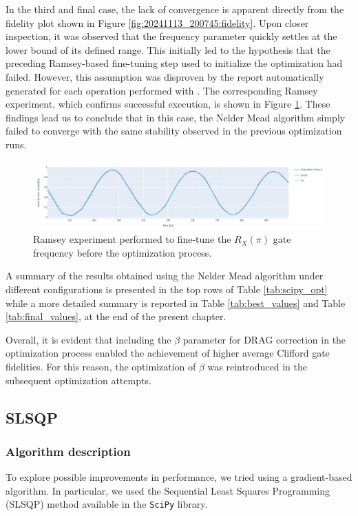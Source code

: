In the third and final case, the lack of convergence is apparent directly from the fidelity plot shown in Figure \ref{fig:20241113_200745:fidelity}.
Upon closer inspection, it was observed that the frequency parameter quickly settles at the lower bound of its defined range. 
This initially led to the hypothesis that the preceding Ramsey-based fine-tuning step used to initialize the optimization had failed.
However, this assumption was disproven by the report automatically generated for each operation performed with \Qibocal.
The corresponding Ramsey experiment, which confirms successful execution, is shown in Figure \ref{fig:Ramsey_NM}.
These findings lead us to conclude that in this case, the Nelder Mead algorithm simply failed to converge with the same stability observed in the previous optimization runs.

\begin{figure}[h!]
    \centering
    \includegraphics[width=\textwidth]{figures/png/RB_optimization/NM/InitialSymplex/20241113_200745/Ramsey.png}
    \caption{Ramsey experiment performed to fine-tune the $R_X(\pi)$ gate frequency before the optimization process.}
    \label{fig:Ramsey_NM}
\end{figure}

A summary of the results obtained using the Nelder Mead algorithm under different configurations is presented in the top rows of Table \ref{tab:scipy_opt} while a more detailed summary is reported in Table \ref{tab:best_values} and Table \ref{tab:final_values}, at the end of the present chapter.

Overall, it is evident that including the $\beta$ parameter for DRAG correction in the optimization process enabled the achievement of higher average Clifford gate fidelities. 
For this reason, the optimization of $\beta$ was reintroduced in the subsequent optimization attempts.

\subsection{SLSQP}
\subsubsection{Algorithm description}
To explore possible improvements in performance, we tried using a gradient-based algorithm. 
In particular, we used the Sequential Least Squares Programming (SLSQP) method available in the \texttt{SciPy} library.

